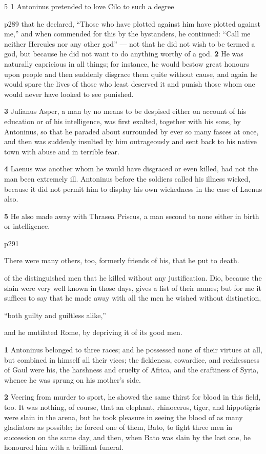 5 \textbf{1} Antoninus pretended to love Cilo to such a degree

p289 that he declared, ``Those who have plotted against him have plotted against me,'' and when commended for this by the bystanders, he continued: ``Call me neither Hercules nor any other god'' \texthebrew{—} not that he did not wish to be termed a god, but because he did not want to do anything worthy of a god. \textbf{2} He was naturally capricious in all things; for instance, he would bestow great honours upon people and then suddenly disgrace them quite without cause, and again he would spare the lives of those who least deserved it and punish those whom one would never have looked to see punished.

\textbf{3} Julianus Asper, a man by no means to be despised either on account of his education or of his intelligence, was first exalted, together with his sons, by Antoninus, so that he paraded about surrounded by ever so many fasces at once, and then was suddenly insulted by him outrageously and sent back to his native town with abuse and in terrible fear.

\textbf{4} Laenus was another whom he would have disgraced or even killed, had not the man been extremely ill. Antoninus before the soldiers called his illness wicked, because it did not permit him to display his own wickedness in the case of Laenus also.

\textbf{5} He also made away with Thrasea Priscus, a man second to none either in birth or intelligence.

p291

There were many others, too, formerly friends of his, that he put to death.

of the distinguished men that he killed without any justification. Dio, because the slain were very well known in those days, gives a list of their names; but for me it suffices to say that he made away with all the men he wished without distinction,

``both guilty and guiltless alike,''

and he mutilated Rome, by depriving it of its good men.

\textbf{1} Antoninus belonged to three races; and he possessed none of their virtues at all, but combined in himself all their vices; the fickleness, cowardice, and recklessness of Gaul were his, the harshness and cruelty of Africa, and the craftiness of Syria, whence he was sprung on his mother's side.

\textbf{2} Veering from murder to sport, he showed the same thirst for blood in this field, too. It was nothing, of course, that an elephant, rhinoceros, tiger, and hippotigris were slain in the arena, but he took pleasure in seeing the blood of as many gladiators as possible; he forced one of them, Bato, to fight three men in succession on the same day, and then, when Bato was slain by the last one, he honoured him with a brilliant funeral.

